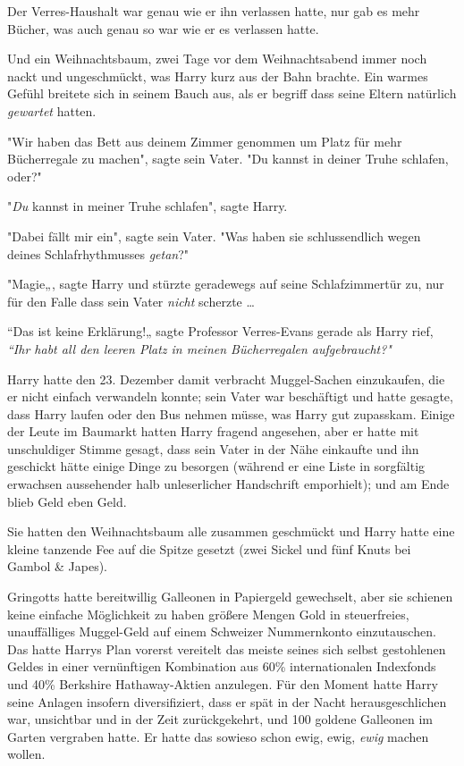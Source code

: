 {Der Verres-Haushalt war genau wie er ihn verlassen hatte, nur gab es mehr Bücher, was auch genau so war wie er es verlassen hatte.

Und ein Weihnachtsbaum, zwei Tage vor dem Weihnachtsabend immer noch nackt und ungeschmückt, was Harry kurz aus der Bahn brachte. Ein warmes Gefühl breitete sich in seinem Bauch aus, als er begriff dass seine Eltern natürlich \emph{gewartet} hatten.

"Wir haben das Bett aus deinem Zimmer genommen um Platz für mehr Bücherregale zu machen", sagte sein Vater. "Du kannst in deiner Truhe schlafen, oder?"

"\emph{Du} kannst in meiner Truhe schlafen", sagte Harry.

"Dabei fällt mir ein", sagte sein Vater. "Was haben sie schlussendlich wegen deines Schlafrhythmusses \emph{getan}?"

"Magie„, sagte Harry und stürzte geradewegs auf seine Schlafzimmertür zu, nur für den Falle dass sein Vater \emph{nicht} scherzte …

“Das ist keine Erklärung!„ sagte Professor Verres-Evans gerade als Harry rief, \emph{“Ihr habt all den leeren Platz in meinen Bücherregalen aufgebraucht?"}

Harry hatte den 23. Dezember damit verbracht Muggel-Sachen einzukaufen, die er nicht einfach verwandeln konnte; sein Vater war beschäftigt und hatte gesagte, dass Harry laufen oder den Bus nehmen müsse, was Harry gut zupasskam. Einige der Leute im Baumarkt hatten Harry fragend angesehen, aber er hatte mit unschuldiger Stimme gesagt, dass sein Vater in der Nähe einkaufte und ihn geschickt hätte einige Dinge zu besorgen (während er eine Liste in sorgfältig erwachsen aussehender halb unleserlicher Handschrift emporhielt); und am Ende blieb Geld eben Geld.

Sie hatten den Weihnachtsbaum alle zusammen geschmückt und Harry hatte eine kleine tanzende Fee auf die Spitze gesetzt (zwei Sickel und fünf Knuts bei Gambol \& Japes).

Gringotts hatte bereitwillig Galleonen in Papiergeld gewechselt, aber sie schienen keine einfache Möglichkeit zu haben größere Mengen Gold in steuerfreies, unauffälliges Muggel-Geld auf einem Schweizer Nummernkonto einzutauschen. Das hatte Harrys Plan vorerst vereitelt das meiste seines sich selbst gestohlenen Geldes in einer vernünftigen Kombination aus 60\% internationalen Indexfonds und 40\% Berkshire Hathaway-Aktien anzulegen. Für den Moment hatte Harry seine Anlagen insofern diversifiziert, dass er spät in der Nacht herausgeschlichen war, unsichtbar und in der Zeit zurückgekehrt, und 100 goldene Galleonen im Garten vergraben hatte. Er hatte das sowieso schon ewig, ewig, \emph{ewig} machen wollen.

}
